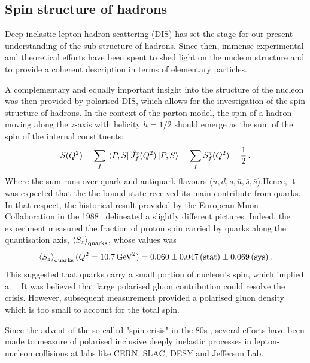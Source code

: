 \subsection*{Spin structure of hadrons}

Deep inelastic lepton-hadron scattering (DIS) has set the stage for our present understanding of the sub-structure of hadrons. Since then, immense experimental and theoretical efforts have been spent to shed light on the nucleon structure and to provide a coherent description in terms of elementary particles.%

A complementary and equally important insight into the structure of the nucleon was then provided by polarised DIS, which allows for the investigation of the spin structure of hadrons. In the context of the parton model, the spin of a hadron moving along the $z$-axis with helicity $h=1/2$ should emerge as the sum of the spin of the internal constituents:
\begin{equation}
  S(Q^2) = \sum_{f} \bra*{P,S} \hat{J}_f^z(Q^2) \ket*{P,S} = \sum_f S^z_f (Q^2) = \frac{1}{2}\,.
\end{equation}
%
Where the sum runs over quark and antiquark flavours ($u,d,s,\bar{u}, \bar{s}, \bar{s}$).Hence, it was expected that the the bound state received its main contribute from quarks. In that respect, the historical result provided by the European Muon Collaboration in the 1988~\cite{EuropeanMuon:1989yki} delineated a slightly different pictures. Indeed, the experiment measured the fraction of proton spin carried by quarks along the quantisation axis, $\left< S_z \right>_{\textrm{quarks}}$, whose values was~\cite{EuropeanMuon:1989yki}
\begin{equation}
  \left< S_z \right>_{\textrm{quarks}} (Q^2 = 10.7 \, \textrm{GeV}^2) = 0.060 \pm 0.047 \, (\textrm{stat}) \pm 0.069 \, (\textrm{sys}) \,.
\end{equation}
This suggested that quarks carry a small portion of nucleon's spin, which implied a ~\cite{Leader_Anselmino}. It was believed that large polarised gluon contribution could resolve the crisis. However, subsequent measurement provided a polarised gluon density which is too small to account for the total spin. 

Since the advent of the so-called "spin crisis" in the 80s \cite{EuropeanMuon:1987isl}, several efforts have been made  to measure of polarised inclusive deeply inelastic processes in lepton-nucleon collisions at labs like CERN, SLAC, DESY and Jefferson Lab. 

